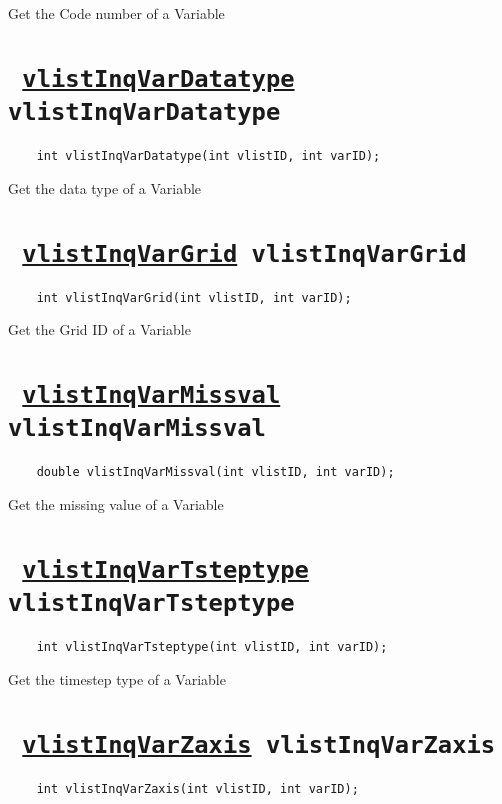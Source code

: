 Get the Code number of a Variable
\ifpdfoutput{}{(\ref{vlistInqVarCode})}


\section*{\texttt{ 
\ifpdf
\hyperref[vlistInqVarDatatype]{vlistInqVarDatatype}
\else
vlistInqVarDatatype
\fi
}}
\begin{verbatim}
    int vlistInqVarDatatype(int vlistID, int varID);
\end{verbatim}

Get the data type of a Variable
\ifpdfoutput{}{(\ref{vlistInqVarDatatype})}


\section*{\texttt{ 
\ifpdf
\hyperref[vlistInqVarGrid]{vlistInqVarGrid}
\else
vlistInqVarGrid
\fi
}}
\begin{verbatim}
    int vlistInqVarGrid(int vlistID, int varID);
\end{verbatim}

Get the Grid ID of a Variable
\ifpdfoutput{}{(\ref{vlistInqVarGrid})}


\section*{\texttt{ 
\ifpdf
\hyperref[vlistInqVarMissval]{vlistInqVarMissval}
\else
vlistInqVarMissval
\fi
}}
\begin{verbatim}
    double vlistInqVarMissval(int vlistID, int varID);
\end{verbatim}

Get the missing value of a Variable
\ifpdfoutput{}{(\ref{vlistInqVarMissval})}


\section*{\texttt{ 
\ifpdf
\hyperref[vlistInqVarTsteptype]{vlistInqVarTsteptype}
\else
vlistInqVarTsteptype
\fi
}}
\begin{verbatim}
    int vlistInqVarTsteptype(int vlistID, int varID);
\end{verbatim}

Get the timestep type of a Variable
\ifpdfoutput{}{(\ref{vlistInqVarTsteptype})}


\section*{\texttt{ 
\ifpdf
\hyperref[vlistInqVarZaxis]{vlistInqVarZaxis}
\else
vlistInqVarZaxis
\fi
}}
\begin{verbatim}
    int vlistInqVarZaxis(int vlistID, int varID);
\end{verbatim}

